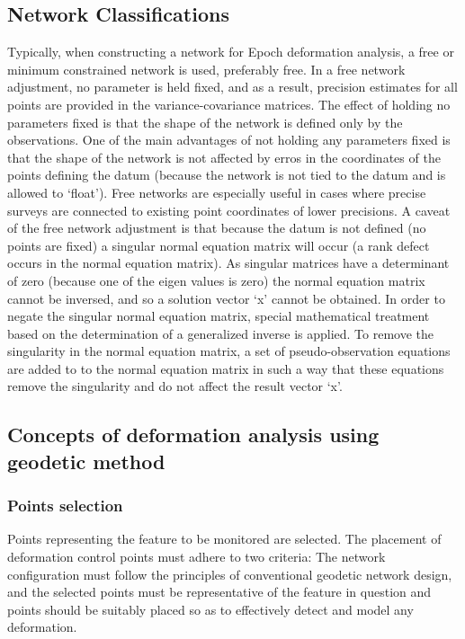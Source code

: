 \documentclass{article}
\begin{document}
\subsection{Network Classifications}
Typically, when constructing a network for Epoch deformation analysis,
a free or minimum constrained network is used, preferably free. In a free
network adjustment, no parameter is held fixed, and as a result, precision
estimates for all points are provided in the variance-covariance matrices.
The effect of holding no parameters fixed is that the shape of the network
is defined only by the observations. One of the main advantages of not holding
any parameters fixed is that the shape of the network is not affected by erros in
the coordinates of the points defining the datum (because the network is not tied
to the datum and is allowed to `float'). Free networks are especially useful
in cases where precise surveys are connected to existing point coordinates
of lower precisions. A caveat of the free network adjustment is that because the
datum is not defined (no points are fixed) a singular normal equation matrix
will occur (a rank defect occurs in the normal equation matrix).
As singular matrices have a determinant of zero (because one of the
eigen values is zero) the normal equation matrix cannot be inversed, and so
a solution vector `x' cannot be obtained. In order to negate the singular normal
equation matrix, special mathematical treatment based on the determination of a
generalized inverse is applied. To remove the singularity in the normal equation
matrix, a set of pseudo-observation equations are added to to the normal
equation matrix in such a way that these equations remove the singularity and
do not affect the result vector `x'.

\subsection{Concepts of deformation analysis using geodetic method}

\subsubsection{Points selection}
Points representing the feature to be monitored are selected.
The placement of deformation control points must adhere to two criteria:
The network configuration must follow the principles of conventional geodetic
network design, and the selected points must be representative of the feature
in question and points should be suitably placed so as to effectively detect and
model any deformation.
\end{document}
